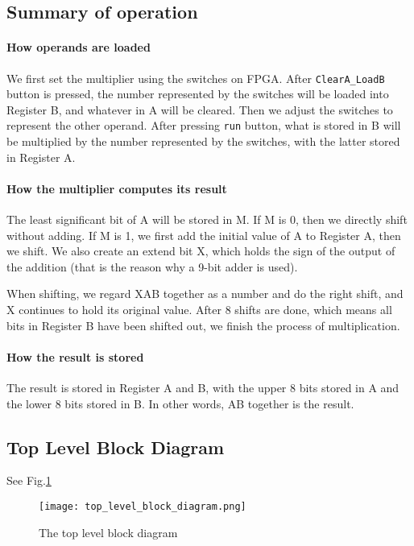 \documentclass[11pt]{article}
\begin{document}
\subsection{Summary of operation}
\paragraph{How operands are loaded}
We first set the multiplier using the switches on FPGA. After \verb|ClearA_LoadB| button is pressed, the number represented by the switches will be loaded into Register B, and whatever in A will be cleared. Then we adjust the switches to represent the other operand. After pressing \verb|run| button, what is stored in B will be multiplied by the number represented by the switches, with the latter stored in Register A.

\paragraph{How the multiplier computes its result}
The least significant bit of A will be stored in M. If M is 0, then we directly shift without adding. If M is 1, we first add the initial value of A to Register A, then we shift. We also create an extend bit X, which holds the sign of the output of the addition (that is the reason why a 9-bit adder is used). 

When shifting, we regard XAB together as a number and do the right shift, and X continues to hold its original value. After 8 shifts are done, which means all bits in Register B have been shifted out, we finish the process of multiplication.
\paragraph{How the result is stored}
The result is stored in Register A and B, with the upper 8 bits stored in A and the lower 8 bits stored in B. In other words, AB together is the result.

\subsection{Top Level Block Diagram}
See Fig.\ref{top_level}
\begin{figure}[h]
    \centering
    \texttt{[image: top\_level\_block\_diagram.png]}
    \caption{The top level block diagram}
    \label{top_level}
\end{figure}
\end{document}
